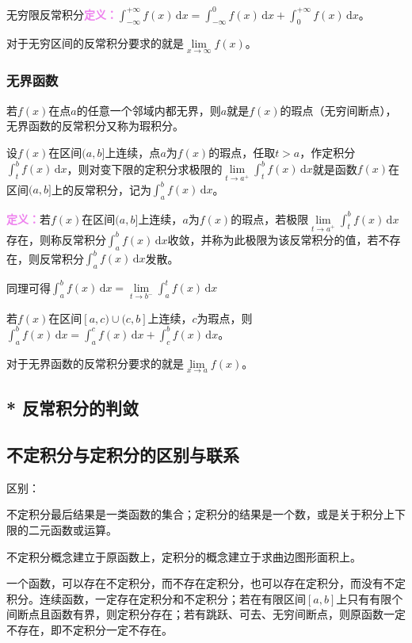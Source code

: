 \documentclass[UTF8, 12pt]{ctexart}
\begin{document}
无穷限反常积分\textcolor{violet}{\textbf{定义：}}$\int_{-\infty}^{+\infty}f(x)\,\textrm{d}x=\int_{-\infty}^0f(x)\,\textrm{d}x+\int_0^{+\infty}f(x)\,\textrm{d}x$。

对于无穷区间的反常积分要求的就是$\lim\limits_{x\to\infty}f(x)$。

\subsubsection{无界函数}

若$f(x)$在点$a$的任意一个邻域内都无界，则$a$就是$f(x)$的瑕点（无穷间断点），无界函数的反常积分又称为瑕积分。

设$f(x)$在区间$(a,b]$上连续，点$a$为$f(x)$的瑕点，任取$t>a$，作定积分$\int_t^bf(x)\,\textrm{d}x$，则对变下限的定积分求极限的$\lim\limits_{t\to a^+}\int_t^bf(x)\,\textrm{d}x$就是函数$f(x)$在区间$(a,b]$上的反常积分，记为$\int_a^bf(x)\,\textrm{d}x$。

\textcolor{violet}{\textbf{定义：}}若$f(x)$在区间$(a,b]$上连续，$a$为$f(x)$的瑕点，若极限$\lim\limits_{t\to a^+}\int_t^bf(x)\,\textrm{d}x$存在，则称反常积分$\int_a^bf(x)\,\textrm{d}x$收敛，并称为此极限为该反常积分的值，若不存在，则反常积分$\int_a^bf(x)\,\textrm{d}x$发散。

同理可得$\int_a^bf(x)\,\textrm{d}x=\lim\limits_{t\to b^-}\int_a^tf(x)\,\textrm{d}x$

若$f(x)$在区间$[a,c)\cup(c,b]$上连续，$c$为瑕点，则$\int_a^bf(x)\,\textrm{d}x=\int_a^cf(x)\,\textrm{d}x+\int_c^bf(x)\,\textrm{d}x$。

对于无界函数的反常积分要求的就是$\lim\limits_{x\to a}f(x)$。

\subsection{* 反常积分的判敛}

\subsection{不定积分与定积分的区别与联系}

区别：

不定积分最后结果是一类函数的集合；定积分的结果是一个数，或是关于积分上下限的二元函数或运算。

不定积分概念建立于原函数上，定积分的概念建立于求曲边图形面积上。

一个函数，可以存在不定积分，而不存在定积分，也可以存在定积分，而没有不定积分。连续函数，一定存在定积分和不定积分；若在有限区间$[a,b]$上只有有限个间断点且函数有界，则定积分存在；若有跳跃、可去、无穷间断点，则原函数一定不存在，即不定积分一定不存在。
\end{document}
